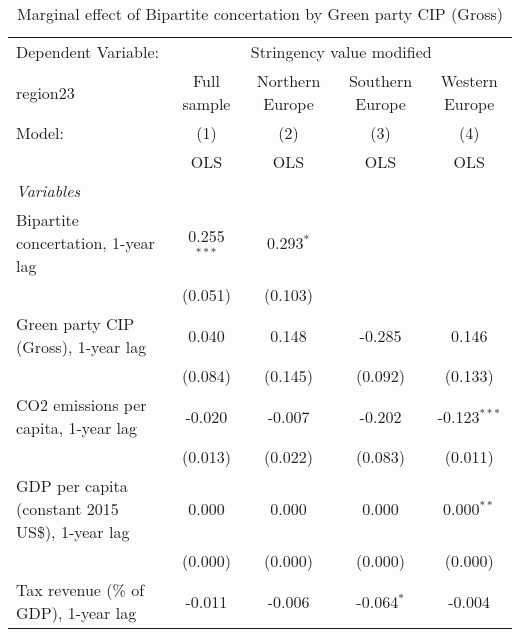 
\begin{table}[htbp]
   \caption{Marginal effect of Bipartite concertation by Green party CIP (Gross)}
   \centering
   \begin{tabular}{lcccc}
      \toprule
      Dependent Variable: & \multicolumn{4}{c}{Stringency value modified}\\
      region23                                                                 & Full sample   & Northern Europe & Southern Europe & Western Europe \\   
      Model:                                                                   & (1)           & (2)             & (3)             & (4)\\  
                                                                               &  OLS          & OLS             & OLS             & OLS\\  
      \midrule
      \emph{Variables}\\
      Bipartite concertation, 1-year lag                                       & 0.255$^{***}$ & 0.293$^{*}$     &                 &   \\   
                                                                               & (0.051)       & (0.103)         &                 &   \\   
      Green party CIP (Gross), 1-year lag                                      & 0.040         & 0.148           & -0.285          & 0.146\\   
                                                                               & (0.084)       & (0.145)         & (0.092)         & (0.133)\\   
      CO2 emissions per capita, 1-year lag                                     & -0.020        & -0.007          & -0.202          & -0.123$^{***}$\\   
                                                                               & (0.013)       & (0.022)         & (0.083)         & (0.011)\\   
      GDP per capita (constant 2015 US\$), 1-year lag                          & 0.000         & 0.000           & 0.000           & 0.000$^{**}$\\   
                                                                               & (0.000)       & (0.000)         & (0.000)         & (0.000)\\   
      Tax revenue (\% of GDP), 1-year lag                                      & -0.011        & -0.006          & -0.064$^{*}$    & -0.004\\   

\end{tabular}
\end{table}
